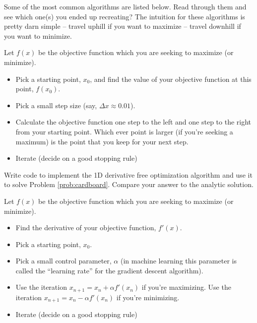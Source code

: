 Some of the most common algorithms are listed below.  Read through them and see which
one(s) you ended up recreating?  The intuition for these algorithms is pretty darn simple
-- travel uphill if you want to maximize -- travel downhill if you want to minimize.

\begin{algorithm}
    Let $f(x)$ be the objective function which you are seeking to maximize (or minimize).
    \begin{itemize}
        \item Pick a starting point, $x_0$, and find the value of your
            objective function at this point, $f(x_0)$.
        \item Pick a small step size (say, $\Delta x \approx 0.01$).
        \item Calculate the objective function one step to the left and
            one step to the right from your starting point.  Which ever
            point is larger (if you're seeking a maximum) is the point
            that you keep for your next step.
        \item Iterate (decide on a good stopping rule)
    \end{itemize}
\end{algorithm}
\begin{problem}
    Write code to implement the 1D derivative free optimization algorithm and use it to solve
    Problem \ref{prob:cardboard}.  Compare your answer to the analytic solution.
\end{problem}

\begin{algorithm}
    Let $f(x)$ be the objective function which you are seeking to maximize (or minimize).
    \begin{itemize}
        \item Find the derivative of your objective function, $f'(x)$.
        \item Pick a starting point, $x_0$.
        \item Pick a small control parameter, $\alpha$ (in machine learning this parameter
            is called the ``learning rate'' for the gradient descent algorithm).
        \item Use the iteration $x_{n+1} = x_n + \alpha f'(x_n) $ if you're maximizing.
            Use the iteration $x_{n+1} = x_n - \alpha f'(x_n)$ if you're minimizing.
        \item Iterate (decide on a good stopping rule)
    \end{itemize}
\end{algorithm}

